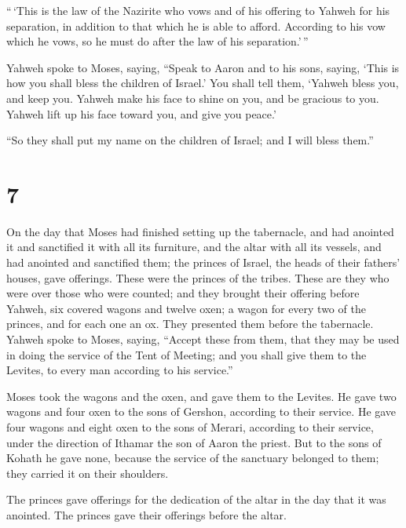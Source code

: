  ``\,`This is the law of the Nazirite who vows and of his
offering to Yahweh for his separation, in addition to that which he is
able to afford. According to his vow which he vows, so he must do after
the law of his separation.'\,''

 Yahweh spoke to Moses, saying,  ``Speak
to Aaron and to his sons, saying, `This is how you shall bless the
children of Israel.' You shall tell them,  `Yahweh bless
you, and keep you.  Yahweh make his face to shine on you,
and be gracious to you.  Yahweh lift up his face toward
you, and give you peace.'

 ``So they shall put my name on the children of Israel;
and I will bless them.''

\hypertarget{section-6}{%
\section{7}\label{section-6}}

 On the day that Moses had finished setting up the
tabernacle, and had anointed it and sanctified it with all its
furniture, and the altar with all its vessels, and had anointed and
sanctified them;  the princes of Israel, the heads of
their fathers' houses, gave offerings. These were the princes of the
tribes. These are they who were over those who were counted;
 and they brought their offering before Yahweh, six
covered wagons and twelve oxen; a wagon for every two of the princes,
and for each one an ox. They presented them before the tabernacle.
 Yahweh spoke to Moses, saying,  ``Accept
these from them, that they may be used in doing the service of the Tent
of Meeting; and you shall give them to the Levites, to every man
according to his service.''

 Moses took the wagons and the oxen, and gave them to the
Levites.  He gave two wagons and four oxen to the sons of
Gershon, according to their service.  He gave four wagons
and eight oxen to the sons of Merari, according to their service, under
the direction of Ithamar the son of Aaron the priest.  But
to the sons of Kohath he gave none, because the service of the sanctuary
belonged to them; they carried it on their shoulders.

 The princes gave offerings for the dedication of the
altar in the day that it was anointed. The princes gave their offerings
before the altar.

